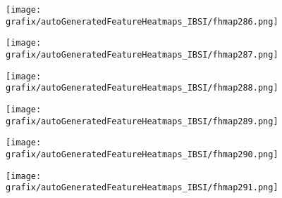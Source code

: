 \hspace{\hsp} 
\begin{subfigure}{\wid\textwidth} 
    \centering 
    \caption{\tiny \sffamily {}} 
    \vspace{\vsp} 
    \texttt{[image: grafix/autoGeneratedFeatureHeatmaps\_IBSI/fhmap286.png]} 
\end{subfigure} 
\hspace{\hsp} 
\begin{subfigure}{\wid\textwidth} 
    \centering 
    \caption{\tiny \sffamily {}} 
    \vspace{\vsp} 
    \texttt{[image: grafix/autoGeneratedFeatureHeatmaps\_IBSI/fhmap287.png]} 
\end{subfigure} 
\hspace{\hsp} 
\begin{subfigure}{\wid\textwidth} 
    \centering 
    \caption{\tiny \sffamily {}} 
    \vspace{\vsp} 
    \texttt{[image: grafix/autoGeneratedFeatureHeatmaps\_IBSI/fhmap288.png]} 
\end{subfigure} 
\hspace{\hsp} 
\begin{subfigure}{\wid\textwidth} 
    \centering 
    \caption{\tiny \sffamily {}} 
    \vspace{\vsp} 
    \texttt{[image: grafix/autoGeneratedFeatureHeatmaps\_IBSI/fhmap289.png]} 
\end{subfigure} 
\hspace{\hsp} 
\begin{subfigure}{\wid\textwidth} 
    \centering 
    \caption{\tiny \sffamily {}} 
    \vspace{\vsp} 
    \texttt{[image: grafix/autoGeneratedFeatureHeatmaps\_IBSI/fhmap290.png]} 
\end{subfigure} 
\hspace{\hsp} 
\begin{subfigure}{\wid\textwidth} 
    \centering 
    \caption{\tiny \sffamily {}} 
    \vspace{\vsp} 
    \texttt{[image: grafix/autoGeneratedFeatureHeatmaps\_IBSI/fhmap291.png]} 
\end{subfigure} 
\hspace{\hsp} 
